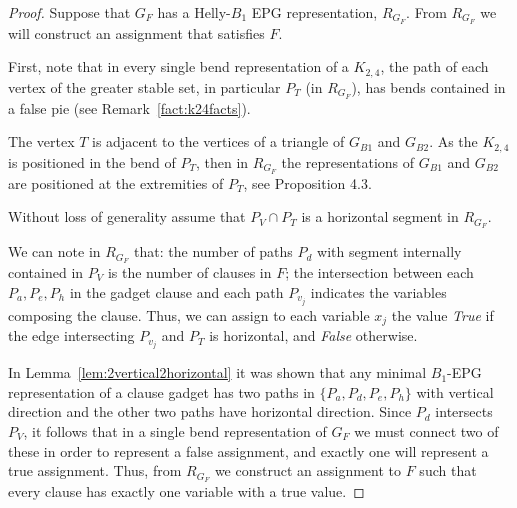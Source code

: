 \documentclass[
submission
]{dmtcs-episciences}
\begin{document}
\begin{proof}%
Suppose that $G_F$ has a Helly-$B_1$ EPG representation, $R_{G_F}$.  From $R_{G_F}$ we will construct an assignment that satisfies $F$. 

First, note that in every single bend representation of a $K_{2,4}$, the path of each vertex of the greater stable set, in particular $P_T$ (in $R_{G_F}$), has bends contained in a false pie (see Remark~\ref{fact:k24facts}).


The vertex $T$ is adjacent to the vertices of a triangle of $G_{B1}$ and $G_{B2}$. As the $K_{2,4}$ is positioned in the bend of $P_T$, then in $R_{G_F}$ the representations of $G_{B1}$ and $G_{B2}$ are positioned at the extremities of $P_T$, see Proposition 4.3. %


Without loss of generality assume that $P_V \cap P_T$ is a horizontal segment in $R_{G_F}$.

We can note in $R_{G_F}$ that: the number of paths $P_{d}$ with segment internally contained in $P_V$ is the number of clauses in $F$; the intersection between each $P_{a}, P_{e}, P_{h}$ in the gadget clause and each path $P_{v_j}$ indicates the variables composing the clause. Thus, we can assign to each variable $ x_{j}$ the value \textit{True} if the edge intersecting $P_{v_j}$ and $P_T$ is horizontal, and \textit{False} otherwise. 


In Lemma~\ref{lem:2vertical2horizontal} it was shown that any minimal $B_1$-EPG representation of a clause gadget has two paths in $\{P_{a}, P_{d}, P_{e}, P_{h}\}$ with vertical direction and the other two paths have horizontal direction. Since $P_{d}$ intersects $P_V$, it follows that in a single bend representation of $G_F$ we must connect two of these in order to represent a false assignment, and exactly one will represent a true assignment. Thus, from $R_{G_F}$ we construct an assignment to $F$ such that every clause has exactly one variable with a true value.  
 \end{proof}
\end{document}
